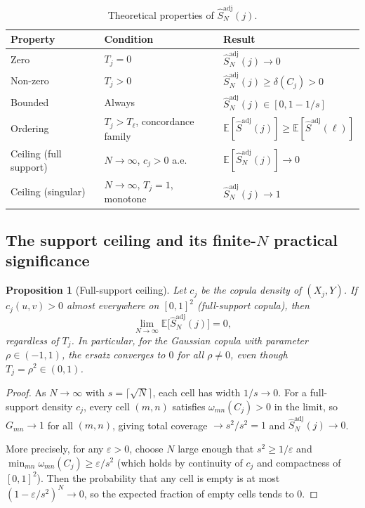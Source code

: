 \documentclass[11pt,a4paper]{article}
\newtheorem{proposition}[theorem]{Proposition}
\theoremstyle{definition}
\newcommand{\E}{\mathbb{E}}
\begin{document}
\begin{table}[h]
\centering
\renewcommand{\arraystretch}{1.3}
\begin{tabular}{lll}
\toprule
Property & Condition & Result \\
\midrule
Zero & $T_j = 0$ & $\hat{S}^{\mathrm{adj}}_N(j) \to 0$ \\
Non-zero & $T_j > 0$ & $\hat{S}^{\mathrm{adj}}_N(j) \ge \delta(C_j) > 0$ \\
Bounded & Always & $\hat{S}^{\mathrm{adj}}_N(j) \in [0, 1 - 1/s]$ \\
Ordering & $T_j > T_\ell$, concordance family & $\E[\hat{S}^{\mathrm{adj}}(j)] \ge \E[\hat{S}^{\mathrm{adj}}(\ell)]$ \\
Ceiling (full support) & $N \to \infty$, $c_j > 0$ a.e. & $\E[\hat{S}^{\mathrm{adj}}_N(j)] \to 0$ \\
Ceiling (singular) & $N \to \infty$, $T_j = 1$, monotone & $\hat{S}^{\mathrm{adj}}_N(j) \to 1$ \\
\bottomrule
\end{tabular}
\caption{Theoretical properties of $\hat{S}^{\mathrm{adj}}_N(j)$.}
\label{tab:summary}
\end{table}

\subsection{The support ceiling and its finite-$N$ practical significance}

\begin{proposition}[Full-support ceiling]
\label{prop:ceiling}
Let $c_j$ be the copula density of $(X_j, Y)$.  If $c_j(u,v) > 0$
almost everywhere on $[0,1]^2$ (full-support copula), then
\[
  \lim_{N\to\infty} \E\bigl[\hat{S}^{\mathrm{adj}}_N(j)\bigr] = 0,
\]
regardless of $T_j$.  In particular, for the Gaussian copula with
parameter $\rho \in (-1,1)$, the ersatz converges to $0$ for all
$\rho \ne 0$, even though $T_j = \rho^2 \in (0,1)$.
\end{proposition}

\begin{proof}
As $N \to \infty$ with $s = \lceil\sqrt{N}\rceil$, each cell has width
$1/s \to 0$.  For a full-support density $c_j$, every cell $(m,n)$
satisfies $\omega_{mn}(C_j) > 0$ in the limit, so $G_{mn} \to 1$ for
all $(m,n)$, giving total coverage $\to s^2/s^2 = 1$ and
$\hat{S}^{\mathrm{adj}}_N(j) \to 0$.

More precisely, for any $\varepsilon > 0$, choose $N$ large enough that
$s^2 \ge 1/\varepsilon$ and $\min_{mn}\omega_{mn}(C_j) \ge \varepsilon/s^2$
(which holds by continuity of $c_j$ and compactness of $[0,1]^2$).  Then
the probability that any cell is empty is at most $(1 - \varepsilon/s^2)^N
\to 0$, so the expected fraction of empty cells tends to 0.
\end{proof}
\end{document}
